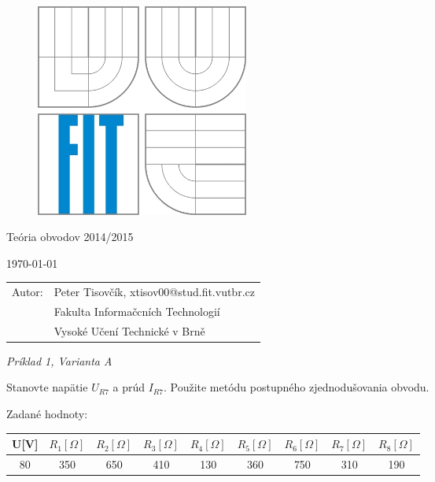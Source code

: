 \documentclass[a4paper,12pt]{article}
\begin{document}
\begin{figure}
  \centering
  \includegraphics[height=7cm]{logo.jpg}
\end{figure}

\begin{center}
\bigskip
\huge
 Teória obvodov 2014/2015 \\
\end{center}

\begin{center}
\large
\today
\end{center}

\vfill

\begin{flushleft}
\large
\begin{tabular}{ll}
Autor:
& Peter Tisovčík, xtisov00@stud.fit.vutbr.cz \\
& Fakulta Informačcních Technologií \\
& Vysoké Učení Technické v Brně \\
\end{tabular}
\end{flushleft}

\newpage
\begin{center}
\emph{Príklad 1, Varianta A}
\end{center}

\bigskip
Stanovte napätie
$U_{R7}$ a prúd $I_{R7}$.
Použite metódu postupného zjednodušovania obvodu.
\bigskip

Zadané hodnoty:
\begin{center}
\begin{tabular} {| c | c | c | c | c | c | c | c | c | }
\hline
U[V] & $R_1[\Omega]$ & $R_2[\Omega]$ & $R_3[\Omega]$ & $R_4[\Omega]$ & $R_5[\Omega]$ & $R_6[\Omega]$ & $R_7[\Omega]$ & $R_8[\Omega]$\\ \hline
80 & 350 & 650 & 410 & 130 & 360 & 750 & 310 & 190 \\ \hline
\end{tabular}
\end{center}
\end{document}
